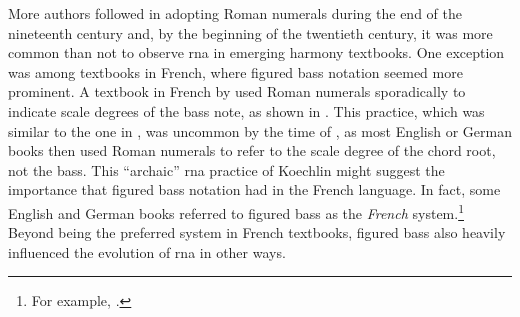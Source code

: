 

More authors followed in adopting Roman numerals during the
end of the nineteenth century and, by the beginning of the
twentieth century, it was more common than not to observe
\gls{rna} in emerging harmony textbooks. One exception was
among textbooks in French, where figured bass notation
seemed more prominent. A textbook in French by
\textcite{koechlin1928traite} used Roman numerals
sporadically to indicate scale degrees of the bass note, as
shown in .
This practice, which was similar to the one in
\textcite{hamilton1840catechism}, was uncommon by the time
of \textcite{koechlin1928traite}, as most English or German
books then used Roman numerals to refer to the scale degree
of the chord root, not the bass. This ``archaic'' \gls{rna}
practice of Koechlin might suggest the importance that
figured bass notation had in the French language. In fact,
some English and German books referred to figured bass as
the \emph{French} system.\footnote{For example,
\textcite{norris1894practical}.} Beyond being the preferred
system in French textbooks, figured bass also heavily
influenced the evolution of \gls{rna} in other ways.

